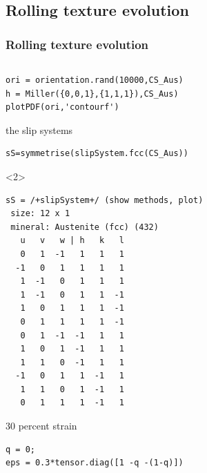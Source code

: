 \documentclass[compress]{beamer}
\begin{document}
\begin{frame}[fragile]
\begin{columns}
\begin{column}{0.35\textwidth}
     \end{column}
   \end{columns}
\end{frame}

\subsection*{Rolling texture evolution}

\begin{frame}[fragile]
  \frametitle{Rolling texture evolution}

  \begin{columns}
    \begin{column}{0.7\textwidth}

      \vspace{-0.7cm}
      \begin{overlayarea}{\textwidth}{8cm}

\begin{lstlisting}[style=input]
ori = orientation.rand(10000,CS_Aus)
h = Miller({0,0,1},{1,1,1}),CS_Aus)
plotPDF(ori,'contourf')
\end{lstlisting}

\pause

the slip systems
\vspace{-0.2cm}
        \begin{lstlisting}[style=input]
sS=symmetrise(slipSystem.fcc(CS_Aus))
      \end{lstlisting}

      \begin{onlyenv}<2>
        \vspace{-0.2cm}
      \begin{lstlisting}[style=output]
sS = /+slipSystem+/ (show methods, plot)
 size: 12 x 1
 mineral: Austenite (fcc) (432)
   u   v   w | h   k   l
   0   1  -1   1   1   1
  -1   0   1   1   1   1
   1  -1   0   1   1   1
   1  -1   0   1   1  -1
   1   0   1   1   1  -1
   0   1   1   1   1  -1
   0   1  -1  -1   1   1
   1   0   1  -1   1   1
   1   1   0  -1   1   1
  -1   0   1   1  -1   1
   1   1   0   1  -1   1
   0   1   1   1  -1   1
      \end{lstlisting}
    \end{onlyenv}

    \pause

30 percent strain
\vspace{-0.2cm}
\begin{lstlisting}[style=input]
q = 0;
eps = 0.3*tensor.diag([1 -q -(1-q)])
\end{lstlisting}


\end{overlayarea}
\end{column}
\end{columns}
\end{frame}
\end{document}
